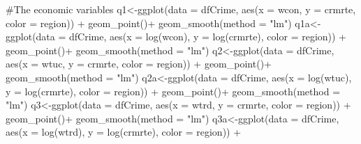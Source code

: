 \documentclass[]{article}
\newenvironment{Shaded}{}{}
\newcommand{\CommentTok}[1]{\textcolor[rgb]{0.00,0.50,0.00}{#1}}
\newcommand{\DataTypeTok}[1]{#1}
\newcommand{\KeywordTok}[1]{\textcolor[rgb]{0.00,0.00,1.00}{#1}}
\newcommand{\NormalTok}[1]{#1}
\newcommand{\OperatorTok}[1]{#1}
\newcommand{\StringTok}[1]{\textcolor[rgb]{0.00,0.50,0.50}{#1}}
\begin{document}
\begin{Shaded}
\begin{Highlighting}[]
\CommentTok{#The economic variables}
\NormalTok{q1<-}\KeywordTok{ggplot}\NormalTok{(}\DataTypeTok{data =}\NormalTok{ dfCrime, }\KeywordTok{aes}\NormalTok{(}\DataTypeTok{x =}\NormalTok{ wcon, }\DataTypeTok{y =}\NormalTok{ crmrte, }\DataTypeTok{color =}\NormalTok{ region)) }\OperatorTok{+}\StringTok{ }
\StringTok{      }\KeywordTok{geom_point}\NormalTok{()}\OperatorTok{+}
\StringTok{  }\KeywordTok{geom_smooth}\NormalTok{(}\DataTypeTok{method =} \StringTok{"lm"}\NormalTok{)}
\NormalTok{q1a<-}\KeywordTok{ggplot}\NormalTok{(}\DataTypeTok{data =}\NormalTok{ dfCrime, }\KeywordTok{aes}\NormalTok{(}\DataTypeTok{x =} \KeywordTok{log}\NormalTok{(wcon), }\DataTypeTok{y =} \KeywordTok{log}\NormalTok{(crmrte), }\DataTypeTok{color =}\NormalTok{ region)) }\OperatorTok{+}\StringTok{ }
\StringTok{      }\KeywordTok{geom_point}\NormalTok{()}\OperatorTok{+}
\StringTok{  }\KeywordTok{geom_smooth}\NormalTok{(}\DataTypeTok{method =} \StringTok{"lm"}\NormalTok{)}
\NormalTok{q2<-}\KeywordTok{ggplot}\NormalTok{(}\DataTypeTok{data =}\NormalTok{ dfCrime, }\KeywordTok{aes}\NormalTok{(}\DataTypeTok{x =}\NormalTok{ wtuc, }\DataTypeTok{y =}\NormalTok{ crmrte, }\DataTypeTok{color =}\NormalTok{ region)) }\OperatorTok{+}\StringTok{ }
\StringTok{      }\KeywordTok{geom_point}\NormalTok{()}\OperatorTok{+}
\StringTok{  }\KeywordTok{geom_smooth}\NormalTok{(}\DataTypeTok{method =} \StringTok{"lm"}\NormalTok{)}
\NormalTok{q2a<-}\KeywordTok{ggplot}\NormalTok{(}\DataTypeTok{data =}\NormalTok{ dfCrime, }\KeywordTok{aes}\NormalTok{(}\DataTypeTok{x =} \KeywordTok{log}\NormalTok{(wtuc), }\DataTypeTok{y =} \KeywordTok{log}\NormalTok{(crmrte), }\DataTypeTok{color =}\NormalTok{ region)) }\OperatorTok{+}\StringTok{ }
\StringTok{      }\KeywordTok{geom_point}\NormalTok{()}\OperatorTok{+}
\StringTok{  }\KeywordTok{geom_smooth}\NormalTok{(}\DataTypeTok{method =} \StringTok{"lm"}\NormalTok{)}
\NormalTok{q3<-}\KeywordTok{ggplot}\NormalTok{(}\DataTypeTok{data =}\NormalTok{ dfCrime, }\KeywordTok{aes}\NormalTok{(}\DataTypeTok{x =}\NormalTok{ wtrd, }\DataTypeTok{y =}\NormalTok{ crmrte, }\DataTypeTok{color =}\NormalTok{ region)) }\OperatorTok{+}\StringTok{ }
\StringTok{      }\KeywordTok{geom_point}\NormalTok{()}\OperatorTok{+}
\StringTok{  }\KeywordTok{geom_smooth}\NormalTok{(}\DataTypeTok{method =} \StringTok{"lm"}\NormalTok{)}
\NormalTok{q3a<-}\KeywordTok{ggplot}\NormalTok{(}\DataTypeTok{data =}\NormalTok{ dfCrime, }\KeywordTok{aes}\NormalTok{(}\DataTypeTok{x =} \KeywordTok{log}\NormalTok{(wtrd), }\DataTypeTok{y =} \KeywordTok{log}\NormalTok{(crmrte), }\DataTypeTok{color =}\NormalTok{ region)) }\OperatorTok{+}\StringTok{ }

\end{Highlighting}
\end{Shaded}
\end{document}
